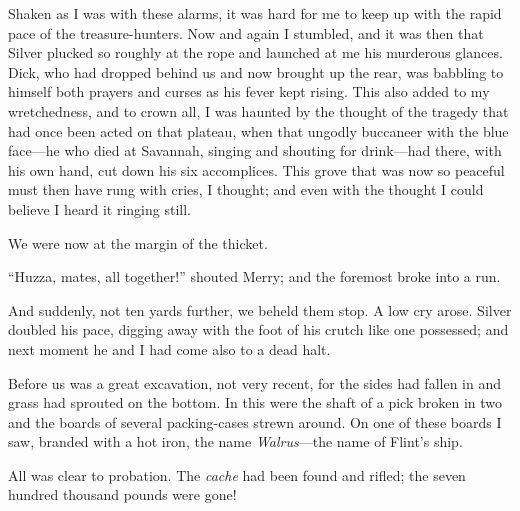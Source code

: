 Shaken as I was with these alarms, it was hard for me to keep up with the rapid pace of the treasure-hunters. Now and again I stumbled, and it was then that Silver plucked so roughly at the rope and launched at me his murderous glances. Dick, who had dropped behind us and now brought up the rear, was babbling to himself both prayers and curses as his fever kept rising. This also added to my wretchedness, and to crown all, I was haunted by the thought of the tragedy that had once been acted on that plateau, when that ungodly buccaneer with the blue face---he who died at Savannah, singing and shouting for drink---had there, with his own hand, cut down his six accomplices. This grove that was now so peaceful must then have rung with cries, I thought; and even with the thought I could believe I heard it ringing still.

We were now at the margin of the thicket.

\enquote{Huzza, mates, all together!} shouted Merry; and the foremost broke into a run.

And suddenly, not ten yards further, we beheld them stop. A low cry arose. Silver doubled his pace, digging away with the foot of his crutch like one possessed; and next moment he and I had come also to a dead halt.

Before us was a great excavation, not very recent, for the sides had fallen in and grass had sprouted on the bottom. In this were the shaft of a pick broken in two and the boards of several packing-cases strewn around. On one of these boards I saw, branded with a hot iron, the name \textit{Walrus}---the name of Flint’s ship.

All was clear to probation. The \textit{cache} had been found and rifled; the seven hundred thousand pounds were gone!